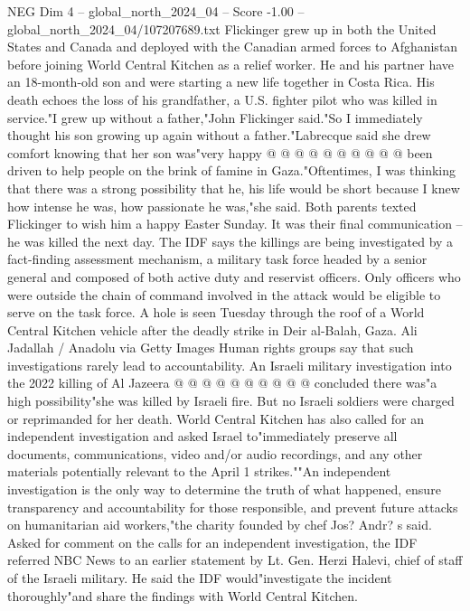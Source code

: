 \begin{textsample}{NEG Dim 4 – global\_north\_2024\_04 – Score -1.00 – global\_north\_2024\_04/107207689.txt}
Flickinger grew up in both the United States and Canada and deployed with the Canadian armed forces to Afghanistan before joining World Central Kitchen as a relief worker.
He and his partner have an 18-month-old son and were starting a new life together in Costa Rica.
His death echoes the loss of his grandfather, a U.S. fighter pilot who was killed in service."I grew up without a father,"John Flickinger said."So I immediately thought his son growing up again without a father."Labrecque said she drew comfort knowing that her son was"very happy @ @ @ @ @ @ @ @ @ @ been driven to help people on the brink of famine in Gaza."Oftentimes, I was thinking that there was a strong possibility that he, his life would be short because I knew how intense he was, how passionate he was,"she said.
Both parents texted Flickinger to wish him a happy Easter Sunday.
It was their final communication -- he was killed the next day.
The IDF says the killings are being investigated by a fact-finding assessment mechanism, a military task force headed by a senior general and composed of both active duty and reservist officers.
Only officers who were outside the chain of command involved in the attack would be eligible to serve on the task force.
A hole is seen Tuesday through the roof of a World Central Kitchen vehicle after the deadly strike in Deir al-Balah, Gaza.
Ali Jadallah / Anadolu via Getty Images Human rights groups say that such investigations rarely lead to accountability.
An Israeli military investigation into the 2022 killing of Al Jazeera @ @ @ @ @ @ @ @ @ @ concluded there was"a high possibility"she was killed by Israeli fire.
But no Israeli soldiers were charged or reprimanded for her death.
World Central Kitchen has also called for an independent investigation and asked Israel to"immediately preserve all documents, communications, video and/or audio recordings, and any other materials potentially relevant to the April 1 strikes.""An independent investigation is the only way to determine the truth of what happened, ensure transparency and accountability for those responsible, and prevent future attacks on humanitarian aid workers,"the charity founded by chef Jos?
Andr? s said.
Asked for comment on the calls for an independent investigation, the IDF referred NBC News to an earlier statement by Lt.
Gen.
Herzi Halevi, chief of staff of the Israeli military.
He said the IDF would"investigate the incident thoroughly"and share the findings with World Central Kitchen.

\end{textsample}
